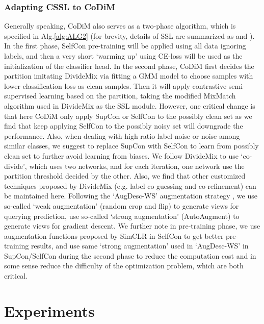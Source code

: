 \documentclass[letterpaper]{article} \usepackage{aaai22}  \usepackage{times}  \usepackage{helvet}  \usepackage{courier}  \usepackage[hyphens]{url}  \usepackage{graphicx} \usepackage{subfigure}
\begin{document}
\subsubsection{Adapting CSSL to CoDiM}
Generally speaking, CoDiM also serves as a two-phase algorithm, which is specified in Alg.\ref{alg:ALG2} (for brevity, details of SSL are summarized as  and ). In the first phase, SelfCon pre-training will be applied using all data ignoring labels, and then a very short `warming up' using CE-loss will be used as the initialization of the classifier head. In the second phase, CoDiM first decides the partition imitating DivideMix via fitting a GMM model to choose samples with lower classification loss as clean samples. Then it will apply contrastive semi-supervised learning based on the partition, taking the modified MixMatch algorithm used in DivideMix as the SSL module. However, one critical change is that here CoDiM only apply SupCon or SelfCon to the possibly clean set as we find that keep applying SelfCon to the possibly noisy set will downgrade the performance. Also, when dealing with high ratio label noise or noise among similar classes, we suggest to replace SupCon with SelfCon to learn from possibly clean set to further avoid learning from biases. We follow DivideMix to use `co-divide', which uses two networks, and for each iteration, one network use the partition threshold decided by the other. Also, we find that other customized techniques proposed by DivideMix (e.g. label co-guessing and co-refinement) can be maintained here. Following the `AugDesc-WS' augmentation strategy \cite{nishi2021augmentation}, we use so-called `weak augmentation' (random crop and flip) to generate views for querying prediction, use so-called `strong augmentation' (AutoAugment) to generate views for gradient descent. We further note in pre-training phase, we use augmentation functions proposed by SimCLR \cite{chen2020simple} in SelfCon to get better pre-training results, and use same `strong augmentation' used in `AugDesc-WS' in SupCon/SelfCon during the second phase to reduce the computation cost and in some sense reduce the difficulty of the optimization problem, which are both critical.
\section{Experiments}
\end{document}
